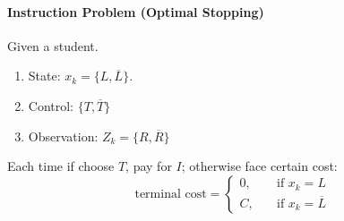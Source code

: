 \paragraph{Instruction Problem (Optimal Stopping)}
Given a student.
\begin{enumerate}
\item
State: $x_k = \{L,\overline{L}\}$.
\item
Control: $\{T,\overline{T}\}$
\item
Observation: $Z_k=\{R,\overline{R}\}$
\end{enumerate}
Each time if choose $T$, pay for $I$; otherwise face certain cost:
\[
\text{terminal cost}=\left\{
\begin{aligned}
0,&\quad\text{if $x_k = L$}\\
C,&\quad\text{if $x_k = \overline{L}$}
\end{aligned}
\right.
\]






















